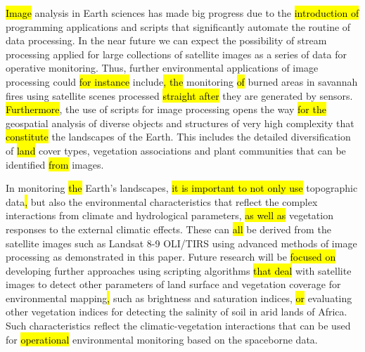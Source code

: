 \documentclass[jimaging,article,submit,pdftex,moreauthors]{Definitions/mdpi}
\begin{document}
\hl{Image} analysis in Earth sciences has made big progress due to the \hl{introduction of }programming applications and scripts that significantly automate the routine of data processing. In the near future we can expect the possibility of stream processing applied for large collections of satellite images as a series of data for operative monitoring. Thus, further environmental applications of image processing could \hl{for instance }include\hl{, the }monitoring \hl{of }burned areas in savannah fires using satellite scenes processed \hl{straight after} they are generated by sensors. \hl{Furthermore}, the use of scripts for image processing opens the way \hl{for the} geospatial analysis of diverse objects and structures of very high complexity that \hl{constitute} the landscapes of the Earth. This includes the detailed diversification of \hl{land} cover types, vegetation associations and plant communities that can be identified \hl{from} images.

In monitoring \hl{the} Earth's landscapes, \hl{it is important to not only use }topographic data\hl{, }but also the environmental characteristics that reflect the complex interactions from climate and hydrological parameters, \hl{as well as} vegetation responses to the external climatic effects. These can \hl{all }be derived from the satellite images such as Landsat 8-9 OLI/TIRS using advanced methods of image processing as demonstrated in this paper. Future research will be \hl{focused on} developing further approaches using scripting algorithms \hl{that deal} with satellite images to detect other parameters of land surface and vegetation coverage for environmental mapping\hl{, }such as brightness and saturation indices, \hl{or }evaluating other vegetation indices for detecting the salinity of soil in arid lands of Africa. Such characteristics reflect the climatic-vegetation interactions that can be used for \hl{operational} environmental monitoring based on the spaceborne data.  


\end{document}

